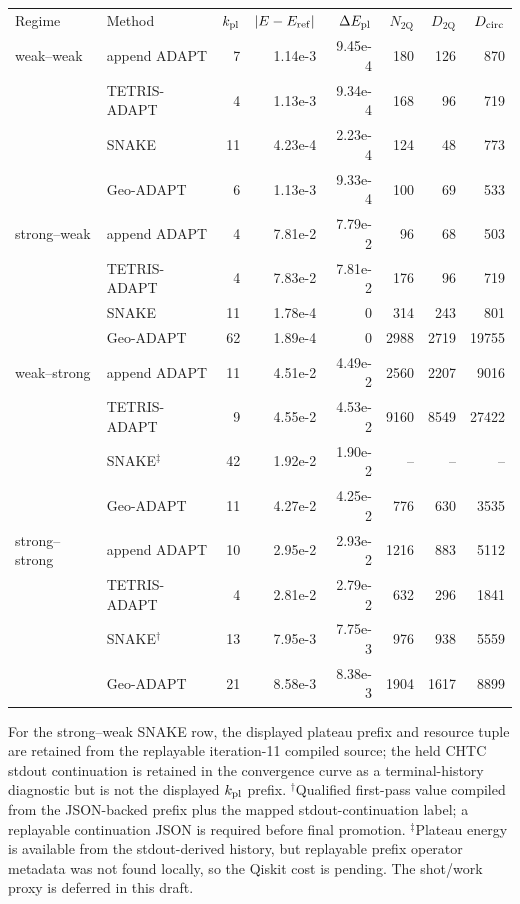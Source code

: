 \documentclass[
  reprint,
  amsmath,
  amssymb,
  aps,
  pra,
  nofootinbib,
  superscriptaddress,
  floatfix
]{revtex4-2}
\newcommand{\twq}{\mathrm{2Q}}
\begin{document}
\begin{widetext}
\begin{minipage}{\textwidth}
\begin{center}
\begin{ruledtabular}
\begin{tabular}{p{}p{}rrrrrr}
Regime & Method & $k_{\rm pl}$ & $|E-E_{\rm ref}|$ & $\Delta E_{\rm pl}$ & $N_{\twq}$ & $D_{\twq}$ & $D_{\rm circ}$ \\
\colrule
weak--weak & append ADAPT & 7 & 1.14e-3 & 9.45e-4 & 180 & 126 & 870 \\
 & TETRIS-ADAPT & 4 & 1.13e-3 & 9.34e-4 & 168 & 96 & 719 \\
 & SNAKE & 11 & 4.23e-4 & 2.23e-4 & 124 & 48 & 773 \\
 & Geo-ADAPT & 6 & 1.13e-3 & 9.33e-4 & 100 & 69 & 533 \\
\colrule
strong--weak & append ADAPT & 4 & 7.81e-2 & 7.79e-2 & 96 & 68 & 503 \\
 & TETRIS-ADAPT & 4 & 7.83e-2 & 7.81e-2 & 176 & 96 & 719 \\
 & SNAKE & 11 & 1.78e-4 & 0 & 314 & 243 & 801 \\
 & Geo-ADAPT & 62 & 1.89e-4 & 0 & 2988 & 2719 & 19755 \\
\colrule
weak--strong & append ADAPT & 11 & 4.51e-2 & 4.49e-2 & 2560 & 2207 & 9016 \\
 & TETRIS-ADAPT & 9 & 4.55e-2 & 4.53e-2 & 9160 & 8549 & 27422 \\
 & SNAKE$^\ddagger$ & 42 & 1.92e-2 & 1.90e-2 & -- & -- & -- \\
 & Geo-ADAPT & 11 & 4.27e-2 & 4.25e-2 & 776 & 630 & 3535 \\
\colrule
strong--strong & append ADAPT & 10 & 2.95e-2 & 2.93e-2 & 1216 & 883 & 5112 \\
 & TETRIS-ADAPT & 4 & 2.81e-2 & 2.79e-2 & 632 & 296 & 1841 \\
 & SNAKE$^\dagger$ & 13 & 7.95e-3 & 7.75e-3 & 976 & 938 & 5559 \\
 & Geo-ADAPT & 21 & 8.58e-3 & 8.38e-3 & 1904 & 1617 & 8899 \\
\end{tabular}
\end{ruledtabular}
\end{center}
\vspace{-0.4ex}
\noindent\footnotesize{For the strong--weak SNAKE row, the displayed plateau prefix and resource tuple are retained from the replayable iteration-11 compiled source; the held CHTC stdout continuation is retained in the convergence curve as a terminal-history diagnostic but is not the displayed \(k_{\rm pl}\) prefix. $^\dagger$Qualified first-pass value compiled from the JSON-backed prefix plus the mapped stdout-continuation label; a replayable continuation JSON is required before final promotion. $^\ddagger$Plateau energy is available from the stdout-derived history, but replayable prefix operator metadata was not found locally, so the Qiskit cost is pending. The shot/work proxy is deferred in this draft.}
\end{minipage}
\par\addvspace{1.0ex}


\end{widetext}
\end{document}
